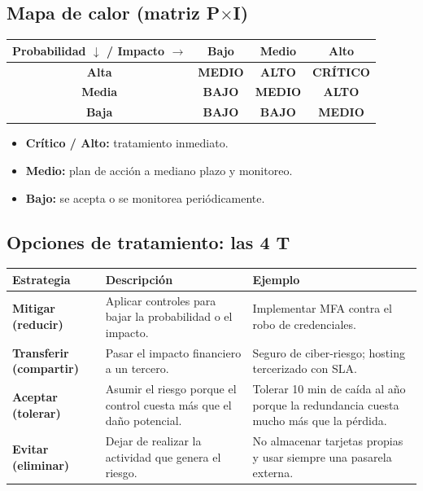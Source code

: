 \documentclass[12pt,a4paper]{article}
\begin{document}
\subsection{Mapa de calor (matriz P$\times$I)}

\begin{center}
\begin{tabular}{|c|c|c|c|}
\hline
\rowcolor{azulPrincipal!20}
\textbf{Probabilidad $\downarrow$ / Impacto $\rightarrow$} & \textbf{Bajo} & \textbf{Medio} & \textbf{Alto} \\
\hline
\textbf{Alta}  & \cellcolor{riskMed}\textbf{MEDIO} & \cellcolor{riskHigh}\textbf{ALTO}  & \cellcolor{riskCrit}\textbf{CR\'ITICO} \\
\hline
\textbf{Media} & \cellcolor{riskLow}\textbf{BAJO}  & \cellcolor{riskMed}\textbf{MEDIO}  & \cellcolor{riskHigh}\textbf{ALTO} \\
\hline
\textbf{Baja}  & \cellcolor{riskLow}\textbf{BAJO}  & \cellcolor{riskLow}\textbf{BAJO}   & \cellcolor{riskMed}\textbf{MEDIO} \\
\hline
\end{tabular}
\end{center}

\begin{itemize}
  \item \textbf{Cr\'itico / Alto:} tratamiento inmediato.
  \item \textbf{Medio:} plan de acci\'on a mediano plazo y monitoreo.
  \item \textbf{Bajo:} se acepta o se monitorea peri\'odicamente.
\end{itemize}

\subsection{Opciones de tratamiento: las 4 T}

\begin{tabularx}{\textwidth}{|>{\bfseries\color{azulPrincipal}}p{2.8cm}|X|X|}
\hline
\rowcolor{grisClaro}
Estrategia & Descripci\'on & Ejemplo \\
\hline
Mitigar (reducir) & Aplicar controles para bajar la probabilidad o el impacto. & Implementar MFA contra el robo de credenciales. \\
\hline
Transferir (compartir) & Pasar el impacto financiero a un tercero. & Seguro de ciber-riesgo; hosting tercerizado con SLA. \\
\hline
Aceptar (tolerar) & Asumir el riesgo porque el control cuesta m\'as que el da\~no potencial. & Tolerar 10 min de ca\'ida al a\~no porque la redundancia cuesta mucho m\'as que la p\'erdida. \\
\hline
Evitar (eliminar) & Dejar de realizar la actividad que genera el riesgo. & No almacenar tarjetas propias y usar siempre una pasarela externa. \\
\hline
\end{tabularx}
\end{document}

